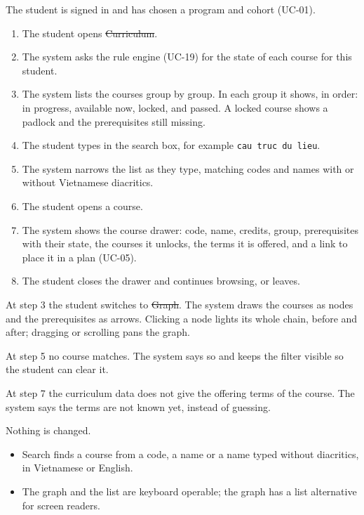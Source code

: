 The student is signed in and has chosen a program and cohort (UC-01).

\begin{enumerate}
  \item The student opens \st{Curriculum}.
  \item The system asks the rule engine (UC-19) for the state of each course for this student.
  \item The system lists the courses group by group. In each group it shows, in order: in progress, available now,
        locked, and passed. A locked course shows a padlock and the prerequisites still missing.
  \item The student types in the search box, for example \texttt{cau truc du lieu}.
  \item The system narrows the list as they type, matching codes and names with or without Vietnamese diacritics.
  \item The student opens a course.
  \item The system shows the course drawer: code, name, credits, group, prerequisites with their state, the courses it
        unlocks, the terms it is offered, and a link to place it in a plan (UC-05).
  \item The student closes the drawer and continues browsing, or leaves.
\end{enumerate}

\begin{altflows}
  \item[A1. Prerequisite graph.] At step 3 the student switches to \st{Graph}. The system draws the courses as nodes and
        the prerequisites as arrows. Clicking a node lights its whole chain, before and after; dragging or scrolling pans
        the graph.
  \item[A2. Nothing matches.] At step 5 no course matches. The system says so and keeps the filter visible so the student
        can clear it.
  \item[A3. Offering unknown.] At step 7 the curriculum data does not give the offering terms of the course. The system
        says the terms are not known yet, instead of guessing.
\end{altflows}

Nothing is changed.

\begin{itemize}
  \item Search finds a course from a code, a name or a name typed without diacritics, in Vietnamese or English.
  \item The graph and the list are keyboard operable; the graph has a list alternative for screen readers.
\end{itemize}

